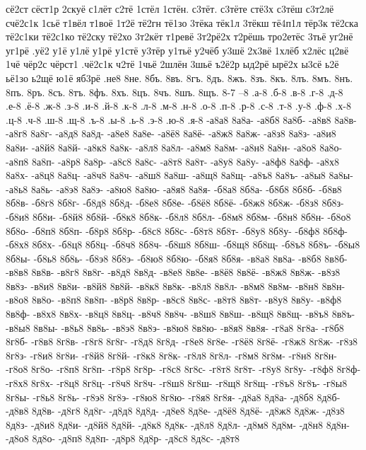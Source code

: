 {сё2ст
сёст1р
2скуё
с1лёт
с2тё
1стёл
1стён.
с3тёт.
с3тёте
стё3х
с3тёш
с3т2лё
счё2с1к
1сьё
т1вёл
т1воё
1т2ё
тё2гн
тё1зо
3тёка
тёк1л
3тёкш
тё4п1л
тёр3к
тё2ска
тё2с1ки
тё2с1ко
тё2ску
тё2хо
3т2кёт
т1ревё
3т2рё2х
т2рёшь
тро2етёс
3тьё
уг2нё
уг1рё
.уё2
у1ё
у1лё
у1рё
у1стё
у3тёр
у1тьё
у2чёб
у3шё
2х3вё
1хлёб
х2лёс
ц2вё
1чё
чёр2с
чёрст1
.чё2с1к
ч2тё
1чьё
2шлён
3шьё
ъ2ё2р
ыд2рё
ырё2х
ы3сё
ь2ё
ьё1зо
ь2щё
ю1ё
яб3рё
.не8
8не.
8бъ.
8въ.
8гъ.
8дъ.
8жъ.
8зъ.
8къ.
8лъ.
8мъ.
8нъ.
8пъ.
8ръ.
8съ.
8тъ.
8фъ.
8хъ.
8цъ.
8чъ.
8шъ.
8щъ.
8-7
--8
.а-8
.б-8
.в-8
.г-8
.д-8
.е-8
.ё-8
.ж-8
.з-8
.и-8
.й-8
.к-8
.л-8
.м-8
.н-8
.о-8
.п-8
.р-8
.с-8
.т-8
.у-8
.ф-8
.х-8
.ц-8
.ч-8
.ш-8
.щ-8
.ъ-8
.ы-8
.ь-8
.э-8
.ю-8
.я-8
-а8а8
8а8а-
-а8б8
8а8б-
-а8в8
8а8в-
-а8г8
8а8г-
-а8д8
8а8д-
-а8е8
8а8е-
-а8ё8
8а8ё-
-а8ж8
8а8ж-
-а8з8
8а8з-
-а8и8
8а8и-
-а8й8
8а8й-
-а8к8
8а8к-
-а8л8
8а8л-
-а8м8
8а8м-
-а8н8
8а8н-
-а8о8
8а8о-
-а8п8
8а8п-
-а8р8
8а8р-
-а8с8
8а8с-
-а8т8
8а8т-
-а8у8
8а8у-
-а8ф8
8а8ф-
-а8х8
8а8х-
-а8ц8
8а8ц-
-а8ч8
8а8ч-
-а8ш8
8а8ш-
-а8щ8
8а8щ-
-а8ъ8
8а8ъ-
-а8ы8
8а8ы-
-а8ь8
8а8ь-
-а8э8
8а8э-
-а8ю8
8а8ю-
-а8я8
8а8я-
-б8а8
8б8а-
-б8б8
8б8б-
-б8в8
8б8в-
-б8г8
8б8г-
-б8д8
8б8д-
-б8е8
8б8е-
-б8ё8
8б8ё-
-б8ж8
8б8ж-
-б8з8
8б8з-
-б8и8
8б8и-
-б8й8
8б8й-
-б8к8
8б8к-
-б8л8
8б8л-
-б8м8
8б8м-
-б8н8
8б8н-
-б8о8
8б8о-
-б8п8
8б8п-
-б8р8
8б8р-
-б8с8
8б8с-
-б8т8
8б8т-
-б8у8
8б8у-
-б8ф8
8б8ф-
-б8х8
8б8х-
-б8ц8
8б8ц-
-б8ч8
8б8ч-
-б8ш8
8б8ш-
-б8щ8
8б8щ-
-б8ъ8
8б8ъ-
-б8ы8
8б8ы-
-б8ь8
8б8ь-
-б8э8
8б8э-
-б8ю8
8б8ю-
-б8я8
8б8я-
-в8а8
8в8а-
-в8б8
8в8б-
-в8в8
8в8в-
-в8г8
8в8г-
-в8д8
8в8д-
-в8е8
8в8е-
-в8ё8
8в8ё-
-в8ж8
8в8ж-
-в8з8
8в8з-
-в8и8
8в8и-
-в8й8
8в8й-
-в8к8
8в8к-
-в8л8
8в8л-
-в8м8
8в8м-
-в8н8
8в8н-
-в8о8
8в8о-
-в8п8
8в8п-
-в8р8
8в8р-
-в8с8
8в8с-
-в8т8
8в8т-
-в8у8
8в8у-
-в8ф8
8в8ф-
-в8х8
8в8х-
-в8ц8
8в8ц-
-в8ч8
8в8ч-
-в8ш8
8в8ш-
-в8щ8
8в8щ-
-в8ъ8
8в8ъ-
-в8ы8
8в8ы-
-в8ь8
8в8ь-
-в8э8
8в8э-
-в8ю8
8в8ю-
-в8я8
8в8я-
-г8а8
8г8а-
-г8б8
8г8б-
-г8в8
8г8в-
-г8г8
8г8г-
-г8д8
8г8д-
-г8е8
8г8е-
-г8ё8
8г8ё-
-г8ж8
8г8ж-
-г8з8
8г8з-
-г8и8
8г8и-
-г8й8
8г8й-
-г8к8
8г8к-
-г8л8
8г8л-
-г8м8
8г8м-
-г8н8
8г8н-
-г8о8
8г8о-
-г8п8
8г8п-
-г8р8
8г8р-
-г8с8
8г8с-
-г8т8
8г8т-
-г8у8
8г8у-
-г8ф8
8г8ф-
-г8х8
8г8х-
-г8ц8
8г8ц-
-г8ч8
8г8ч-
-г8ш8
8г8ш-
-г8щ8
8г8щ-
-г8ъ8
8г8ъ-
-г8ы8
8г8ы-
-г8ь8
8г8ь-
-г8э8
8г8э-
-г8ю8
8г8ю-
-г8я8
8г8я-
-д8а8
8д8а-
-д8б8
8д8б-
-д8в8
8д8в-
-д8г8
8д8г-
-д8д8
8д8д-
-д8е8
8д8е-
-д8ё8
8д8ё-
-д8ж8
8д8ж-
-д8з8
8д8з-
-д8и8
8д8и-
-д8й8
8д8й-
-д8к8
8д8к-
-д8л8
8д8л-
-д8м8
8д8м-
-д8н8
8д8н-
-д8о8
8д8о-
-д8п8
8д8п-
-д8р8
8д8р-
-д8с8
8д8с-
-д8т8
}
